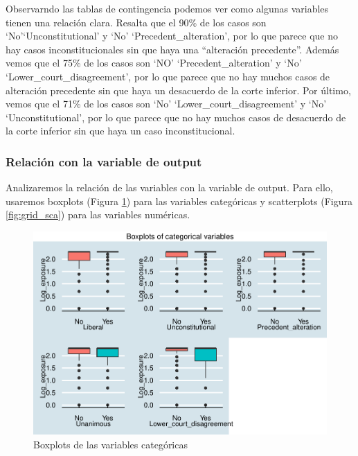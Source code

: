 \documentclass[
]{article}
\begin{document}
Observarndo las tablas de contingencia podemos ver como algunas
variables tienen una relación clara. Resalta que el 90\% de los casos
son `No'`Unconstitutional' y `No' `Precedent\_alteration', por lo que
parece que no hay casos inconstitucionales sin que haya una ``alteración
precedente''. Además vemos que el 75\% de los casos son `NO'
`Precedent\_alteration' y `No' `Lower\_court\_disagreement', por lo que
parece que no hay muchos casos de alteración precedente sin que haya un
desacuerdo de la corte inferior. Por último, vemos que el 71\% de los
casos son `No' `Lower\_court\_disagreement' y `No' `Unconstitutional',
por lo que parece que no hay muchos casos de desacuerdo de la corte
inferior sin que haya un caso inconstitucional.

\hypertarget{relaciuxf3n-con-la-variable-de-output}{%
\subsubsection{Relación con la variable de
output}\label{relaciuxf3n-con-la-variable-de-output}}

Analizaremos la relación de las variables con la variable de output.
Para ello, usaremos boxplots (Figura \ref{fig:grid_box}) para las
variables categóricas y scatterplots (Figura \ref{fig:grid_sca}) para
las variables numéricas.

\begin{figure}

{\centering \includegraphics[width=0.75\linewidth]{anacalt-regresion_files/figure-latex/grid_box-1} 

}

\caption{Boxplots de las variables categóricas}\label{fig:grid_box}
\end{figure}
\end{document}
